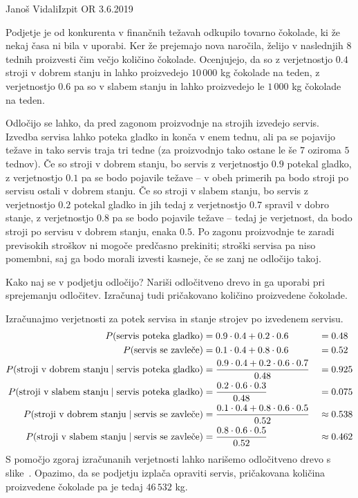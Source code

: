 \begin{naloga}{Janoš Vidali}{Izpit OR 3.6.2019}
\begin{vprasanje}
Podjetje je od konkurenta v finančnih težavah odkupilo tovarno čokolade,
ki že nekaj časa ni bila v uporabi.
Ker že prejemajo nova naročila,
želijo v naslednjih $8$ tednih proizvesti čim večjo količino čokolade.
Ocenjujejo, da so z verjetnostjo $0.4$ stroji v dobrem stanju
in lahko proizvedejo $10\,000$ kg čokolade na teden,
z verjetnostjo $0.6$ pa so v slabem stanju
in lahko proizvedejo le $1\,000$ kg čokolade na teden.

Odločijo se lahko, da pred zagonom proizvodnje na strojih izvedejo servis.
Izvedba servisa lahko poteka gladko in konča v enem tednu,
ali pa se pojavijo težave in tako servis traja tri tedne
(za proizvodnjo tako ostane le še $7$ oziroma $5$ tednov).
Če so stroji v dobrem stanju, bo servis z verjetnostjo $0.9$ potekal gladko,
z verjetnostjo $0.1$ pa se bodo pojavile težave
-- v obeh primerih pa bodo stroji po servisu ostali v dobrem stanju.
Če so stroji v slabem stanju,
bo servis z verjetnostjo $0.2$ potekal gladko
in jih tedaj z verjetnostjo $0.7$ spravil v dobro stanje,
z verjetnostjo $0.8$ pa se bodo pojavile težave
-- tedaj je verjetnost,
da bodo stroji po servisu v dobrem stanju, enaka $0.5$.
Po zagonu proizvodnje te zaradi previsokih stroškov
ni mogoče predčasno prekiniti;
stroški servisa pa niso pomembni,
saj ga bodo morali izvesti kasneje, če se zanj ne odločijo takoj.

Kako naj se v podjetju odločijo?
Nariši odločitveno drevo in ga uporabi pri sprejemanju odločitev.
Izračunaj tudi pričakovano količino proizvedene čokolade.
\end{vprasanje}

\begin{odgovor}
Izračunajmo verjetnosti za potek servisa
in stanje strojev po izvedenem servisu.
\begin{alignat*}{2}
P(\text{servis poteka gladko}) &= 0.9 \cdot 0.4 + 0.2 \cdot 0.6 &&= 0.48 \\
P(\text{servis se zavleče}) &= 0.1 \cdot 0.4 + 0.8 \cdot 0.6 &&= 0.52 \\
P(\text{stroji v dobrem stanju} \;|\; \text{servis poteka gladko}) &=
{0.9 \cdot 0.4 + 0.2 \cdot 0.6 \cdot 0.7 \over 0.48} &&= 0.925 \\
P(\text{stroji v slabem stanju} \;|\; \text{servis poteka gladko}) &=
{0.2 \cdot 0.6 \cdot 0.3 \over 0.48} &&= 0.075 \\
P(\text{stroji v dobrem stanju} \;|\; \text{servis se zavleče}) &=
{0.1 \cdot 0.4 + 0.8 \cdot 0.6 \cdot 0.5 \over 0.52} &&\approx 0.538 \\
P(\text{stroji v slabem stanju} \;|\; \text{servis se zavleče}) &=
{0.8 \cdot 0.6 \cdot 0.5 \over 0.52} &&\approx 0.462
\end{alignat*}
S pomočjo zgoraj izračunanih verjetnosti
lahko narišemo odločitveno drevo s slike~\fig.
Opazimo, da se podjetju izplača opraviti servis,
pričakovana količina proizvedene čokolade pa je tedaj $46\,532$ kg.

\begin{slika}
\makebox[\textwidth][c]{
\pgfslika
}
\end{slika}
\end{odgovor}
\end{naloga}
